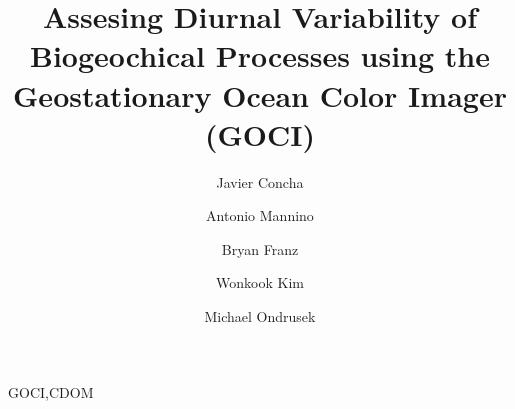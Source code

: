 \documentclass[onecolumn,3p,letterpaper,11pt]{elsarticle}
\begin{document}
\linenumbers

\begin{frontmatter}

\title{Assesing Diurnal Variability of Biogeochical Processes using the Geostationary Ocean Color Imager (GOCI)}


\author[oeladdress,usraaddress]{Javier Concha}

\author[oeladdress]{Antonio Mannino}

\author[oeladdress]{Bryan Franz}

\author[kiostaddress]{Wonkook Kim}

\author[usgsaddress]{Michael Ondrusek}

\address[oeladdress]{Ocean Ecology lab, NASA Goddard Space Flight Center, Greenbelt, MD, USA}
\address[usraaddress]{Universities Space Research Association, Columbia, MD, USA}
\address[kiostaddress]{Korea Institute of Ocean Science and Technology, 787 Haean-ro, Ansan, Republic of Korea}

\address[usgsaddress]{NOAA/NESDIS Center for Weather and Climate Prediction, College Park, Maryland, USA}
\begin{abstract}


%


%
 

%

%

%


%
 
%


%

\end{abstract}

\begin{keyword}
GOCI\sep CDOM
\end{keyword}

\end{frontmatter}
\end{document}

